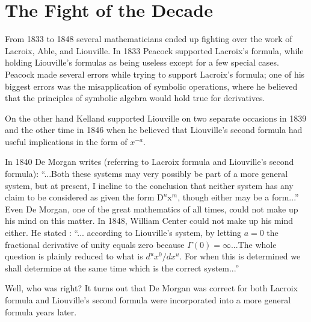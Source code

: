 \documentclass[a4paper,14pt,oneside]{book}
\theoremstyle{plain}
\theoremstyle{definition}
\theoremstyle{remark}
\begin{document}
\section{The Fight of the Decade}
         \begin{center}
         \begin{flushleft}
         \justify
         \Large{
\par{From 1833 to 1848 several mathematicians ended up fighting over the work of Lacroix, Able, and Liouville. In 1833 Peacock supported Lacroix's formula, while holding Liouville's formulas as being useless except for a few special cases. Peacock made several errors while trying to support Lacroix's formula; one of his biggest errors was the misapplication of symbolic operations, where he believed that the principles of symbolic algebra would hold true for derivatives.}

\par{On the other hand Kelland supported Liouville on two separate occasions in 1839 and the other time in 1846 when he believed that Liouville's second formula had useful implications in the form of $x^{-a}$.}

\par{In 1840 De Morgan \cite{bb6} writes (referring to Lacroix formula and Liouville's second formula): \enquote{...Both these systems may very possibly be part of a more general system, but at present, I incline to the conclusion that neither system has any claim to be considered as given the form $\mathrm{D}^{n} \mathrm{x}^{m}$, though either may be a form...} Even De Morgan, one of the great mathematics of all times, could not make up his mind on this matter. In 1848, William Center could not make up his mind either. He stated \cite{bb7}: \enquote{... according to Liouville's system, by letting $a=0$ the fractional derivative of unity equals zero because $\Gamma(0)=\infty$...The whole question is plainly reduced to what is $d^{u} x^{0} / dx^{u}$. For when this is determined we shall determine at the same time which is the correct system...}}
\par{Well, who was right? It turns out that De Morgan was correct for both Lacroix formula and Liouville's second formula were incorporated into a more general formula years later.}}
\end{flushleft}        \end{center}
\end{document}
